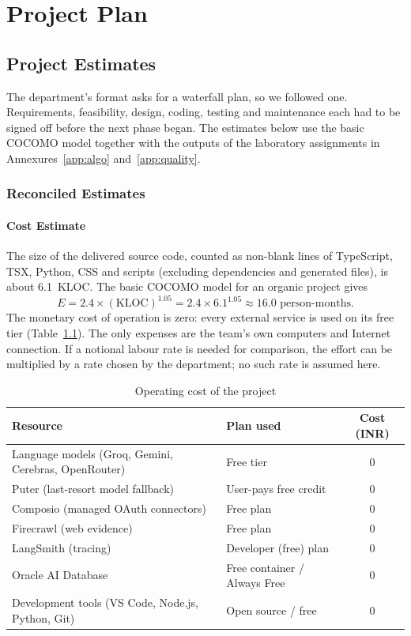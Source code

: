 \documentclass[oneside,a4paper,12pt]{report}
\begin{document}
\chapter{Project Plan}

\section{Project Estimates}
The department's format asks for a waterfall plan, so we followed one. Requirements, feasibility, design, coding, testing and maintenance each had to be signed off before the next phase began. The estimates below use the basic COCOMO model together with the outputs of the laboratory assignments in Annexures~\ref{app:algo} and~\ref{app:quality}.
\subsection{Reconciled Estimates}
\subsubsection{Cost Estimate}
The size of the delivered source code, counted as non-blank lines of TypeScript, TSX, Python, CSS and scripts (excluding dependencies and generated files), is about 6.1~KLOC. The basic COCOMO model for an organic project gives
\[ E = 2.4 \times (\mathrm{KLOC})^{1.05} = 2.4 \times 6.1^{1.05} \approx 16.0 \mbox{ person-months}. \]
The monetary cost of operation is zero: every external service is used on its free tier (Table~\ref{tab:cost}). The only expenses are the team's own computers and Internet connection. If a notional labour rate is needed for comparison, the effort can be multiplied by a rate chosen by the department; no such rate is assumed here.

\begin{table}[!htbp]
\begin{center}
\def\arraystretch{1.3}
\begin{tabular}{| p{5.6cm} | p{4.2cm} | c |}
\hline
Resource & Plan used & Cost (INR) \\ \hline
Language models (Groq, Gemini, Cerebras, OpenRouter) & Free tier & 0 \\ \hline
Puter (last-resort model fallback) & User-pays free credit & 0 \\ \hline
Composio (managed OAuth connectors) & Free plan & 0 \\ \hline
Firecrawl (web evidence) & Free plan & 0 \\ \hline
LangSmith (tracing) & Developer (free) plan & 0 \\ \hline
Oracle AI Database & Free container / Always Free & 0 \\ \hline
Development tools (VS Code, Node.js, Python, Git) & Open source / free & 0 \\ \hline
\end{tabular}
\end{center}
\caption{Operating cost of the project}
\label{tab:cost}
\end{table}
\end{document}
